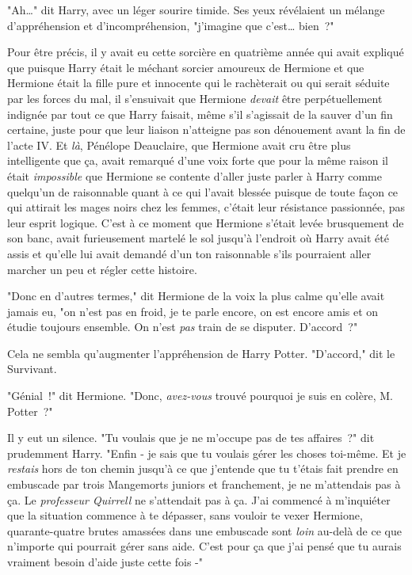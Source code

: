 "Ah…" dit Harry, avec un léger sourire timide. Ses yeux révélaient un mélange d'appréhension et d'incompréhension, "j'imagine que c'est… bien~?"

Pour être précis, il y avait eu cette sorcière en quatrième année qui avait expliqué que puisque Harry était le méchant sorcier amoureux de Hermione et que Hermione était la fille pure et innocente qui le rachèterait ou qui serait séduite par les forces du mal, il s'ensuivait que Hermione \emph{devait} être perpétuellement indignée par tout ce que Harry faisait, même s'il s'agissait de la sauver d'un fin certaine, juste pour que leur liaison n'atteigne pas son dénouement avant la fin de l'acte IV. Et \emph{là}, Pénélope Deauclaire, que Hermione avait cru être plus intelligente que ça, avait remarqué d'une voix forte que pour la même raison il était \emph{impossible} que Hermione se contente d'aller juste parler à Harry comme quelqu'un de raisonnable quant à ce qui l'avait blessée puisque de toute façon ce qui attirait les mages noirs chez les femmes, c'était leur résistance passionnée, pas leur esprit logique. C'est à ce moment que Hermione s'était levée brusquement de son banc, avait furieusement martelé le sol jusqu'à l'endroit où Harry avait été assis et qu'elle lui avait demandé d'un ton raisonnable s'ils pourraient aller marcher un peu et régler cette histoire.

"Donc en d'autres termes," dit Hermione de la voix la plus calme qu'elle avait jamais eu, "on n'est pas en froid, je te parle encore, on est encore amis et on étudie toujours ensemble. On n'est \emph{pas} train de se disputer. D'accord~?"

Cela ne sembla qu'augmenter l'appréhension de Harry Potter. "D'accord," dit le Survivant.

"Génial~!" dit Hermione. "Donc, \emph{avez-vous} trouvé pourquoi je suis en colère, M. Potter~?"

Il y eut un silence. "Tu voulais que je ne m'occupe pas de tes affaires~?" dit prudemment Harry. "Enfin - je sais que tu voulais gérer les choses toi-même. Et je \emph{restais} hors de ton chemin jusqu'à ce que j'entende que tu t'étais fait prendre en embuscade par trois Mangemorts juniors et franchement, je ne m'attendais pas à ça. Le \emph{professeur Quirrell} ne s'attendait pas à ça. J'ai commencé à m'inquiéter que la situation commence à te dépasser, sans vouloir te vexer Hermione, quarante-quatre brutes amassées dans une embuscade sont \emph{loin} au-delà de ce que n'importe qui pourrait gérer sans aide. C'est pour ça que j'ai pensé que tu aurais vraiment besoin d'aide juste cette fois -"

